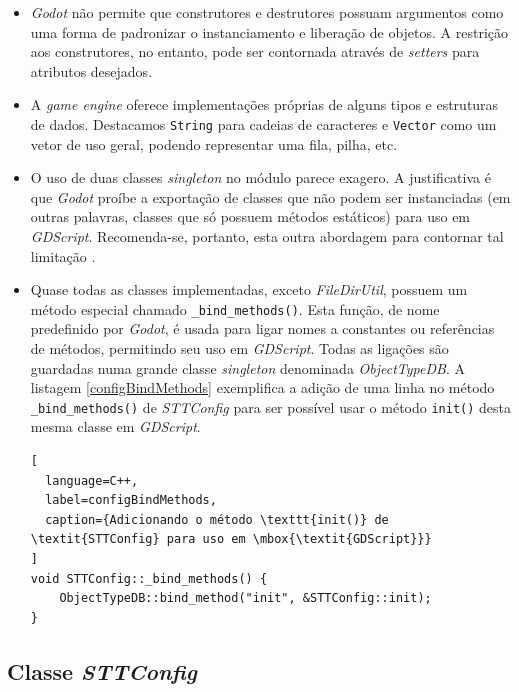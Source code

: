\begin{itemize}
\item \textit{Godot} não permite que construtores e destrutores possuam argumentos como uma forma de padronizar o instanciamento e liberação de objetos. A restrição aos construtores, no entanto, pode ser contornada através de \textit{setters} para atributos desejados.

\item A \textit{game engine} oferece implementações próprias de alguns tipos e estruturas de dados. Destacamos \texttt{String} para cadeias de caracteres e \texttt{Vector} como um vetor de uso geral, podendo representar uma fila, pilha, etc.

\item O uso de duas classes \textit{singleton} no módulo parece exagero. A justificativa é que \textit{Godot} proíbe a exportação de classes que não podem ser instanciadas (em outras palavras, classes que só possuem métodos estáticos) para uso em \mbox{\textit{GDScript}}. Recomenda-se, portanto, esta outra abordagem para contornar tal limitação \citep{godotStaticClasses}.

\item Quase todas as classes implementadas, exceto \textit{FileDirUtil}, possuem um método especial chamado \texttt{\_bind\_methods()}. Esta função, de nome predefinido por \textit{Godot}, é usada para ligar nomes a constantes ou referências de métodos, permitindo seu uso em \mbox{\textit{GDScript}}. Todas as ligações são guardadas numa grande classe \textit{singleton} denominada \textit{ObjectTypeDB}. A listagem \ref{configBindMethods} exemplifica a adição de uma linha no método \texttt{\_bind\_methods()} de \textit{STTConfig} para ser possível usar o método \texttt{init()} desta mesma classe em \mbox{\textit{GDScript}}.

\begin{lstlisting}[
  language=C++,
  label=configBindMethods,
  caption={Adicionando o método \texttt{init()} de \textit{STTConfig} para uso em \mbox{\textit{GDScript}}}
]
void STTConfig::_bind_methods() {
    ObjectTypeDB::bind_method("init", &STTConfig::init);
}
\end{lstlisting}
\end{itemize}


\subsection{Classe \textit{STTConfig}}

